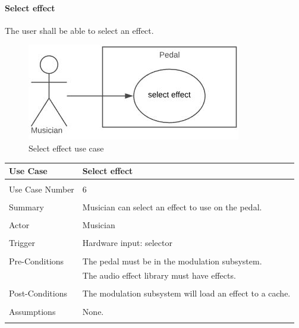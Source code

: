             \clearpage
            
            \paragraph{Select effect} 
            The user shall be able to select an effect.
            \begin{figure}[!ht]
                \centering
                \includegraphics[width=.5\textwidth]{diagrams/use_cases/uc-select-effect.JPG}
                \caption{Select effect use case}
                \label{fig:uc-select-effect}
            \end{figure}
            
            \begin{table}[!ht]
                \centering
                \begin{tabular}{l l}
                    Use Case & Select effect \\
                    \hline \\
                    Use Case Number & 6 \\ \\
                    Summary & Musician can select an effect to use on the pedal. \\ \\
                    Actor & Musician \\ \\
                    Trigger & Hardware input: selector \\ \\
                    Pre-Conditions & The pedal must be in the modulation subsystem. \\
                    & The audio effect library must have effects. \\ \\
                    Post-Conditions & The modulation subsystem will load an effect to a cache. \\ \\
                    Assumptions & None.\\ \\
                \end{tabular}
            \end{table}            
            
